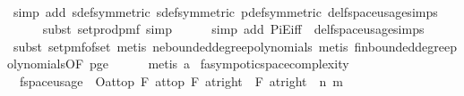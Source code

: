 \begin{isabellebody}
\ \ \ \ \isamarkupfalse%
\ {\isacharparenleft}{\kern0pt}simp\ add{\isacharcolon}{\kern0pt}\ sdef{\isacharbrackleft}{\kern0pt}symmetric{\isacharbrackright}{\kern0pt}\ sdef{\isacharbrackleft}{\kern0pt}symmetric{\isacharbrackright}{\kern0pt}\ p{\isacharunderscore}{\kern0pt}def{\isacharbrackleft}{\kern0pt}symmetric{\isacharbrackright}{\kern0pt}\ del{\isacharcolon}{\kern0pt}f{}{\isacharunderscore}{\kern0pt}space{\isacharunderscore}{\kern0pt}usage{\isachardot}{\kern0pt}simps{\isacharparenright}{\kern0pt}\isanewline
\ \ \ \ \isamarkupfalse%
\ {\isacharparenleft}{\kern0pt}subst\ set{\isacharunderscore}{\kern0pt}prod{\isacharunderscore}{\kern0pt}pmf{\isacharcomma}{\kern0pt}\ simp{\isacharparenright}{\kern0pt}\isanewline
\ \ \ \ \isamarkupfalse%
\ {\isacharparenleft}{\kern0pt}simp\ add{\isacharcolon}{\kern0pt}\ PiE{\isacharunderscore}{\kern0pt}iff\ \ del{\isacharcolon}{\kern0pt}f{}{\isacharunderscore}{\kern0pt}space{\isacharunderscore}{\kern0pt}usage{\isachardot}{\kern0pt}simps{\isacharparenright}{\kern0pt}\isanewline
\ \ \ \ \isamarkupfalse%
\ {\isacharparenleft}{\kern0pt}subst\ set{\isacharunderscore}{\kern0pt}pmf{\isacharunderscore}{\kern0pt}of{\isacharunderscore}{\kern0pt}set{\isacharcomma}{\kern0pt}\ metis\ ne{\isacharunderscore}{\kern0pt}bounded{\isacharunderscore}{\kern0pt}degree{\isacharunderscore}{\kern0pt}polynomials{\isacharcomma}{\kern0pt}\ metis\ fin{\isacharunderscore}{\kern0pt}bounded{\isacharunderscore}{\kern0pt}degree{\isacharunderscore}{\kern0pt}polynomials{\isacharbrackleft}{\kern0pt}OF\ p{\isacharunderscore}{\kern0pt}ge{\isacharunderscore}{\kern0pt}{}{\isacharbrackright}{\kern0pt}{\isacharparenright}{\kern0pt}\isanewline
\ \ \ \ \isamarkupfalse%
\ {\isacharparenleft}{\kern0pt}metis\ a{\isacharparenright}{\kern0pt}\isanewline
{}\isamarkupfalse%
%
\endisatagproof
{\isafoldproof}%
%
\isadelimproof
\isanewline
%
\endisadelimproof
\isanewline
{}\isamarkupfalse%
\ f{}{\isacharunderscore}{\kern0pt}asympotic{\isacharunderscore}{\kern0pt}space{\isacharunderscore}{\kern0pt}complexity{\isacharcolon}{\kern0pt}\isanewline
\ \ {\isachardoublequoteopen}f{}{\isacharunderscore}{\kern0pt}space{\isacharunderscore}{\kern0pt}usage\ {\isasymin}\ O{\isacharbrackleft}{\kern0pt}at{\isacharunderscore}{\kern0pt}top\ {\isasymtimes}\isactrlsub F\ at{\isacharunderscore}{\kern0pt}top\ {\isasymtimes}\isactrlsub F\ at{\isacharunderscore}{\kern0pt}right\ {}\ {\isasymtimes}\isactrlsub F\ at{\isacharunderscore}{\kern0pt}right\ {}{\isacharbrackright}{\kern0pt}{\isacharparenleft}{\kern0pt}{\isasymlambda}\ {\isacharparenleft}{\kern0pt}n{\isacharcomma}{\kern0pt}\ m{\isacharcomma}{\kern0pt}\ {\isasymepsilon}{\isacharcomma}{\kern0pt}\ {\isasymdelta}{\isacharparenright}{\kern0pt}{\isachardot}{\kern0pt}\ \isanewline

\end{isabellebody}
